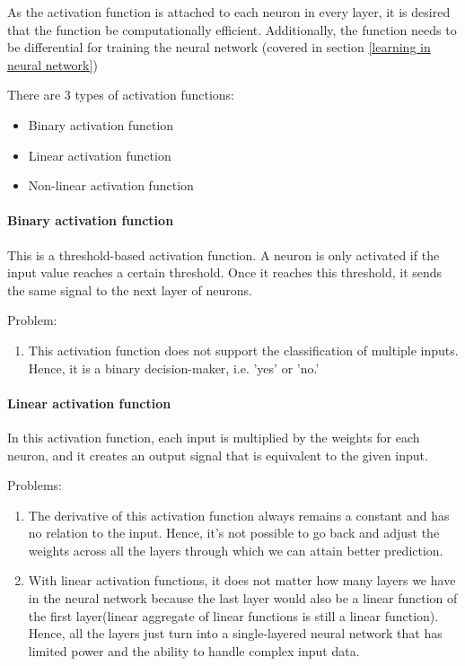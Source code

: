 \par

As the activation function is attached to each neuron in every layer, it is desired that the function be computationally efficient. Additionally, the function needs to be differential for training the neural network (covered in section \ref{learning in neural network}) 

There are 3 types of activation functions:

\begin{itemize}
    \item Binary activation function
    \item Linear activation function
    \item Non-linear activation function
\end{itemize}

\paragraph{Binary activation function}

This is a threshold-based activation function. A neuron is only activated if the input value reaches a certain threshold. Once it reaches this threshold, it sends the same signal to the next layer of neurons. 


\par
Problem:
\begin{enumerate}
    \item This activation function does not support the classification of multiple inputs. Hence, it is a binary decision-maker, i.e. 'yes' or 'no.'
\end{enumerate}


\paragraph{Linear activation function}

In this activation function, each input is multiplied by the weights for each neuron, and it creates an output signal that is equivalent to the given input.

\newpage
Problems: 
\begin{enumerate}
    \item The derivative of this activation function always remains a constant and has no relation to the input. Hence, it's not possible to go back and adjust the weights across all the layers through which we can attain better prediction. 
    \item With linear activation functions, it does not matter how many layers we have in the neural network because the last layer would also be a linear function of the first layer(linear aggregate of linear functions is still a linear function). Hence, all the layers just turn into a single-layered neural network that has limited power and the ability to handle complex input data.
\end{enumerate}

